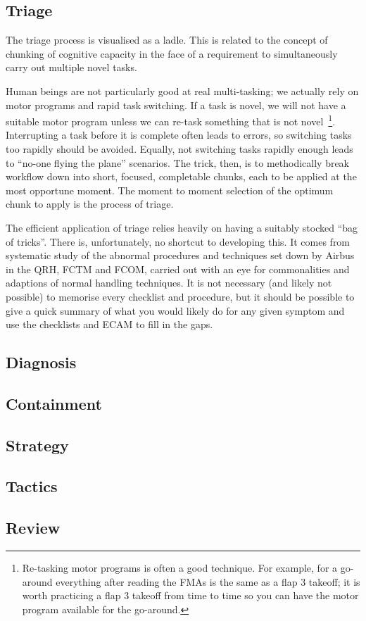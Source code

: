 \documentclass[a4paper,12pt]{article} \usepackage[utf8]{inputenc}
\begin{document}
\subsection{Triage}
The triage process is visualised as a ladle. This is related to the
concept of chunking of cognitive capacity in the face of a requirement
to simultaneously carry out multiple novel tasks.

Human beings are not particularly good at real multi-tasking; we
actually rely on motor programs and rapid task switching. If a task is
novel, we will not have a suitable motor program unless we can re-task
something that is not novel\
\footnote{Re-tasking motor programs is often a good technique. For
  example, for a go-around everything after reading the FMAs is the same
  as a flap 3 takeoff; it is worth practicing a flap 3 takeoff from time
  to time so you can have the motor program available for the
  go-around.}. Interrupting a task before it is complete often leads to
errors, so switching tasks too rapidly should be avoided. Equally, not
switching tasks rapidly enough leads to ``no-one flying the plane''
scenarios. The trick, then, is to methodically break workflow down into
short, focused, completable chunks, each to be applied at the most
opportune moment. The moment to moment selection of the optimum chunk to
apply is the process of triage.

The efficient application of triage relies heavily on having a suitably
stocked ``bag of tricks''. There is, unfortunately, no shortcut to
developing this. It comes from systematic study of the abnormal
procedures and techniques set down by Airbus in the QRH, FCTM and FCOM,
carried out with an eye for commonalities and adaptions of normal
handling techniques. It is not necessary (and likely not possible) to
memorise every checklist and procedure, but it should be possible to
give a quick summary of what you would likely do for any given symptom
and use the checklists and ECAM to fill in the gaps.

\subsection{Diagnosis}

\subsection{Containment}
\subsection{Strategy}
\subsection{Tactics}
\subsection{Review}
\end{document}
